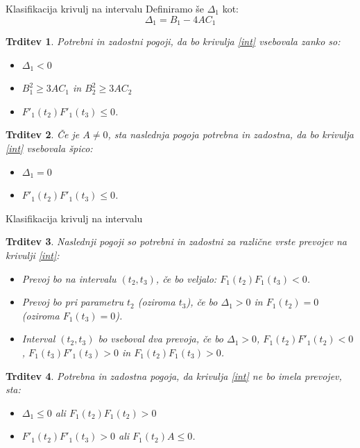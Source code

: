 \documentclass{beamer} %
\newtheorem{trditev}{Trditev}
\begin{document}
\begin{frame}{Klasifikacija krivulj na intervalu}
	Definiramo še $\Delta_1$ kot:
	\[  \Delta_1= B_1 - 4AC_1 \]
	\begin{trditev}
		Potrebni in zadostni pogoji, da bo krivulja \eqref{int} vsebovala zanko so:
		\begin{itemize}
			\item  $\Delta_1 <0$
			\item $B^2_1 \geq 3AC_1$ in $B^2_2 \geq 3AC_2$
			\item $F'_1(t_2) F'_1(t_3) \leq 0$.
		\end{itemize}
	\end{trditev}
	\begin{trditev}
	Če je $A \neq 0$, sta naslednja pogoja potrebna in zadostna, da bo krivulja \eqref{int} vsebovala špico:
	\begin{itemize}
		\item  $\Delta_1 =0$
		\item $F'_1(t_2) F'_1(t_3) \leq 0$.
	\end{itemize}
\end{trditev}
\end{frame}

\begin{frame}{Klasifikacija krivulj na intervalu}
	\begin{trditev}
		Naslednji pogoji so potrebni in zadostni za različne vrste prevojev na krivulji \eqref{int}:
		\begin{itemize}
			\item Prevoj bo na intervalu $(t_2, t_3)$, če bo veljalo:
			$F_1(t_2)F_1(t_3) <0$.
			\item Prevoj bo pri parametru $t_2$ (oziroma $t_3$), če bo
			$\Delta_1 > 0$ in $F_1(t_2) = 0$ (oziroma $F_1(t_3) = 0$).
			\item Interval $(t_2, t_3)$ bo vseboval dva prevoja, če bo $\Delta_1 >0 $, $F_1(t_2)F'_1(t_2) <0$, $F_1(t_3)F'_1(t_3) >0$ in $F_1(t_2)F_1(t_3) >0$. 
		\end{itemize}
	\end{trditev}
	\begin{trditev}
		Potrebna in zadostna pogoja, da krivulja \eqref{int} ne bo imela prevojev, sta:
		\begin{itemize}
			\item $\Delta_1 \leq 0$ ali $F_1(t_2)F_1(t_2) > 0$
			\item $F'_1(t_2)F'_1(t_3)>0$ ali $F_1(t_2)A \leq 0$.
		\end{itemize}
	\end{trditev}
\end{frame}
\end{document}
